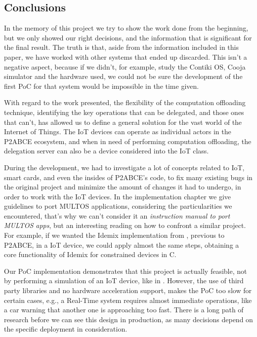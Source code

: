 \documentclass[journal]{IEEEtran}
\begin{document}
\subsection{Conclusions}


In the memory of this project we try to show the work done from the beginning, but we only showed our right decisions, and the information that is significant for the final result. The truth is that, aside from the information included in this paper, we have worked with other systems that ended up discarded. This isn't a negative aspect, because if we didn't, for example, study the Contiki OS, Cooja simulator and the hardware used, we could not be sure the development of the first PoC for that system would be impossible in the time given.


With regard to the work presented, the flexibility of the computation offloading technique, identifying the key operations that can be delegated, and those ones that can't, has allowed us to define a general solution for the vast world of the Internet of Things. The IoT devices can operate as individual actors in the P2ABCE ecosystem, and when in need of performing computation offloading, the delegation server can also be a device considered into the IoT class.




During the development, we had to investigate a lot of concepts related to IoT, smart cards, and even the insides of P2ABCE's code, to fix many existing bugs in the original project and minimize the amount of changes it had to undergo, in order to work with the IoT devices. In the implementation chapter we give guidelines to port MULTOS applications, considering the particularities we encountered, that's why we can't consider it an \textit{instruction manual to port MULTOS apps}, but an interesting reading on how to confront a similar project. For example, if we wanted the Idemix implementation from \cite{vullers2013efficient}, previous to P2ABCE, in a IoT device, we could apply almost the same steps, obtaining a core functionality of Idemix for constrained devices in C.

Our PoC implementation demonstrates that this project is actually feasible, not by performing a simulation of an IoT device, like in \cite{vanet}. However, the use of third party libraries and no hardware acceleration support, makes the PoC too slow for certain cases, e.g., a Real-Time system requires almost immediate operations, like a car warning that another one is approaching too fast.
There is a long path of research before we can see this design in production, as many decisions depend on the specific deployment in consideration.
\end{document}
